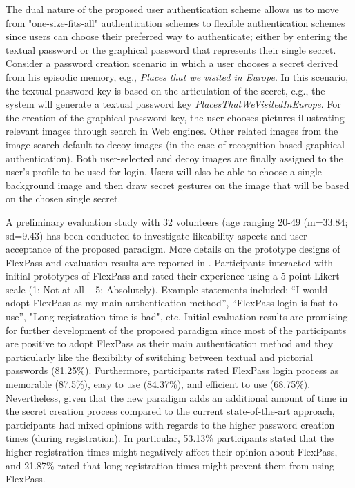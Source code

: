 The dual nature of the proposed user authentication scheme allows us to move from "one-size-fits-all" authentication schemes to flexible authentication schemes since users can choose their preferred way to authenticate; either by entering the textual password or the graphical password that represents their single secret. Consider a password creation scenario in which a user chooses a secret derived from his episodic memory, e.g., \emph{Places that we visited in Europe}. In this scenario, the textual password key is based on the articulation of the secret, e.g., the system will generate a textual password key \emph{PlacesThatWeVisitedInEurope}. For the creation of the graphical password key, the user chooses pictures illustrating relevant images through search in Web engines. Other related images from the image search default to decoy images (in the case of recognition-based graphical authentication). Both user-selected and decoy images are finally assigned to the user’s profile to be used for login. Users will also be able to choose a single background image and then draw secret gestures on the image that will be based on the chosen single secret.

A preliminary evaluation study with 32 volunteers (age ranging 20-49 (m=33.84; sd=9.43) has been conducted to investigate likeability aspects and user acceptance of the proposed paradigm. More details on the prototype designs of FlexPass and evaluation results are reported in \cite{belk}. Participants interacted with initial prototypes of FlexPass and rated their experience using a 5-point Likert scale (1: Not at all – 5: Absolutely). Example statements included: “I would adopt FlexPass as my main authentication method”, “FlexPass login is fast to use”, "Long registration time is bad", etc. Initial evaluation results are promising for further development of the proposed paradigm since most of the participants are positive to adopt FlexPass as their main authentication method and they particularly like the flexibility of switching between textual and pictorial passwords (81.25\%). Furthermore, participants rated FlexPass login process as memorable (87.5\%), easy to use (84.37\%), and efficient to use (68.75\%). Nevertheless, given that the new paradigm adds an additional amount of time in the secret creation process compared to the current state-of-the-art approach, participants had mixed opinions with regards to the higher password creation times (during registration). In particular, 53.13\% participants stated that the higher registration times might negatively affect their opinion about FlexPass, and 21.87\% rated that long registration times might prevent them from using FlexPass.

